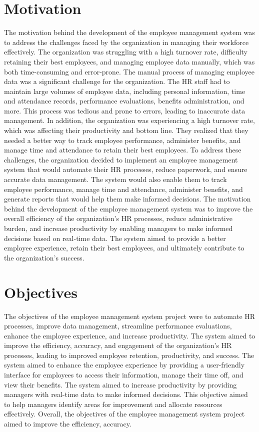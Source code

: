 \documentclass{article}
\begin{document}
\section{Motivation}
The motivation behind the development of the employee management
system was to address the challenges faced by the organization in
managing their workforce effectively. The organization was struggling
with a high turnover rate, difficulty retaining their best employees, and
managing employee data manually, which was both time-consuming and
error-prone. The manual process of managing employee data was a
significant challenge for the organization. The HR staff had to maintain
large volumes of employee data, including personal information, time
and attendance records, performance evaluations, benefits
administration, and more. This process was tedious and prone to errors,
leading to inaccurate data management. In addition, the organization
was experiencing a high turnover rate, which was affecting their 
productivity and bottom line. They realized that they needed a better
way to track employee performance, administer benefits, and manage
time and attendance to retain their best employees. To address these
challenges, the organization decided to implement an employee
management system that would automate their HR processes, reduce
paperwork, and ensure accurate data management. The system would
also enable them to track employee performance, manage time and
attendance, administer benefits, and generate reports that would help
them make informed decisions. The motivation behind the development
of the employee management system was to improve the overall
efficiency of the organization's HR processes, reduce administrative
burden, and increase productivity by enabling managers to make
informed decisions based on real-time data. The system aimed to
provide a better employee experience, retain their best employees, and
ultimately contribute to the organization's success.
\section{Objectives}
The objectives of the employee management system project were to
automate HR processes, improve data management, streamline
performance evaluations, enhance the employee experience, and
increase productivity. The system aimed to improve the efficiency,
accuracy, and engagement of the organization's HR processes, leading to
improved employee retention, productivity, and success. The system
aimed to enhance the employee experience by providing a user-friendly
interface for employees to access their information, manage their time
off, and view their benefits. The system aimed to increase productivity
by providing managers with real-time data to make informed decisions.
This objective aimed to help managers identify areas for improvement 
and allocate resources effectively. Overall, the objectives of the
employee management system project aimed to improve the efficiency,
accuracy.
\end{document}
